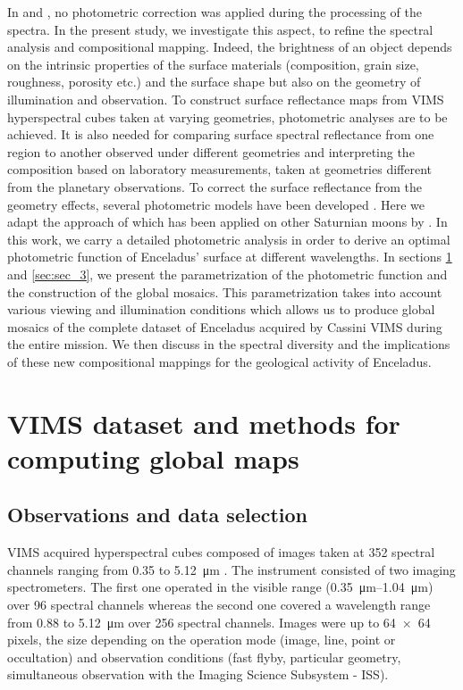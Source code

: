 \documentclass{arxiv-icarus}
\begin{document}
In \cite{Combe2019} and \citep{Scipioni2017}, no photometric correction was applied during the processing of the spectra. In the present study, we investigate this aspect, to refine the spectral analysis and compositional mapping. Indeed, the brightness of an object depends on the intrinsic properties of the surface materials (composition, grain size, roughness, porosity etc.) and the surface shape but also on the geometry of illumination and observation. To construct surface reflectance maps from VIMS hyperspectral cubes taken at varying geometries, photometric analyses are to be achieved. It is also needed for comparing surface spectral reflectance from one region to another observed under different geometries and interpreting the composition based on laboratory measurements, taken at geometries different from the planetary observations. To correct the surface reflectance from the geometry effects, several photometric models have been developed \citep[\eg][]{Hapke1963, Hapke1981, Hapke2012, Minnaert1941, Shkuratov2011}. Here we adapt the approach of \cite{Shkuratov2011} which has been applied on other Saturnian moons by \cite{Filacchione2018a, Filacchione2018}.
In this work, we carry a detailed photometric analysis in order to derive an optimal photometric function of Enceladus' surface at different wavelengths. In sections \ref{sec:sec_2} and \ref{sec:sec_3}, we present the parametrization of the photometric function and the construction of the global mosaics. This parametrization takes into account various viewing and illumination conditions which allows us to produce global mosaics of the complete dataset of Enceladus acquired by Cassini VIMS during the entire mission. We then discuss in  the spectral diversity and the implications of these new compositional mappings for the geological activity of Enceladus.


\section{VIMS dataset and methods for computing global maps}\label{sec:sec_2}
\subsection{Observations and data selection}\label{sec:sec_2.1}

VIMS acquired hyperspectral cubes composed of images taken at 352 spectral channels ranging from \num{0.35} to \SI{5.12}{\um} \citep{Brown2004}. The instrument consisted of two imaging spectrometers. The first one operated in the visible range (\SIrange{0.35}{1.04}{\um}) over \num{96} spectral channels whereas the second one covered a wavelength range from \num{0.88} to \SI{5.12}{\um} over \num{256} spectral channels. Images were up to \num{64 x 64} pixels, the size depending on the operation mode (image, line, point or occultation) and observation conditions (fast flyby, particular geometry, simultaneous observation with the Imaging Science Subsystem - ISS).
\end{document}
